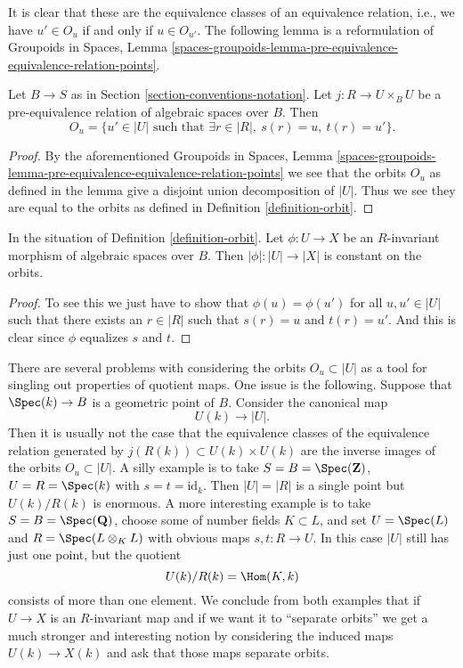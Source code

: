 \noindent
It is clear that these are the equivalence classes of an equivalence relation,
i.e., we have $u' \in O_u$ if and only if $u \in O_{u'}$. The following lemma
is a reformulation of
Groupoids in Spaces,
Lemma \ref{spaces-groupoids-lemma-pre-equivalence-equivalence-relation-points}.

\begin{lemma}
\label{lemma-pre-equivalence-equivalence-relation-points}
Let $B \to S$ as in Section \ref{section-conventions-notation}.
Let $j : R \to U \times_B U$ be a pre-equivalence relation
of algebraic spaces over $B$. Then
$$
O_u =
\{u' \in |U| \text{ such that } \exists r \in |R|, \ s(r) = u, \ t(r) = u'\}.
$$
\end{lemma}

\begin{proof}
By the aforementioned
Groupoids in Spaces,
Lemma \ref{spaces-groupoids-lemma-pre-equivalence-equivalence-relation-points}
we see that the orbits $O_u$ as defined in the lemma give a disjoint
union decomposition of $|U|$. Thus we see they are equal to the
orbits as defined in Definition \ref{definition-orbit}.
\end{proof}

\begin{lemma}
\label{lemma-invariant-map-constant-on-orbit}
In the situation of Definition \ref{definition-orbit}.
Let $\phi : U \to X$ be an $R$-invariant morphism of algebraic spaces over
$B$. Then $|\phi| : |U| \to |X|$ is constant on the orbits.
\end{lemma}

\begin{proof}
To see this we just have to show that $\phi(u) = \phi(u')$
for all $u, u' \in |U|$ such that
there exists an $r \in |R|$ such that $s(r) = u$ and $t(r) = u'$.
And this is clear since $\phi$ equalizes $s$ and $t$.
\end{proof}

\noindent
There are several problems with considering the orbits $O_u \subset |U|$
as a tool for singling out properties of quotient maps. One issue is the
following. Suppose that $\Spec(k) \to B$
is a geometric point of $B$. Consider the canonical map
$$
U(k) \longrightarrow |U|.
$$
Then it is usually not the case that the equivalence classes
of the equivalence relation generated by $j(R(k)) \subset U(k) \times U(k)$
are the inverse images of the orbits $O_u \subset |U|$.
A silly example is to take $S = B = \Spec(\mathbf{Z})$,
$U = R = \Spec(k)$ with $s = t = \text{id}_k$. Then $|U| = |R|$ is
a single point but $U(k)/R(k)$ is enormous.
A more interesting example is to take $S = B = \Spec(\mathbf{Q})$,
choose some of number fields $K \subset L$, and set $U = \Spec(L)$
and $R = \Spec(L \otimes_K L)$ with obvious maps $s, t : R \to U$.
In this case $|U|$ still has just one point, but the quotient
$$
U(k)/R(k) = \Hom(K, k)
$$
consists of more than one element. We conclude from both examples
that if $U \to X$ is an $R$-invariant map and if we want it to
``separate orbits'' we get a much stronger and interesting notion by
considering the induced maps $U(k) \to X(k)$ and ask that
those maps separate orbits.

